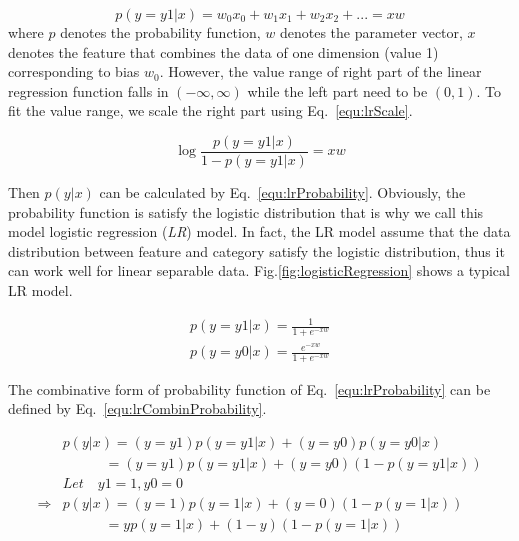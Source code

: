 \documentclass[runningheads,openany]{xhlPaper}
\begin{document}
\begin{equation}
\label{equ:lrLinear}
p\left(y = y1|x\right) = {w_0x_0} + {w_1}{x_1} + {w_2}{x_2} + ... = xw
\end{equation}
where $p$ denotes the probability function, $w$ denotes the parameter vector, $x$ denotes the feature that combines the data of one dimension (value 1) corresponding to bias $w_0$. However, the value range of right part of the linear regression function falls in $\left(-\infty, \infty\right)$ while the left part need to be $\left(0, 1\right)$. To fit the value range, we scale the right part using Eq.~\ref{equ:lrScale}.

\begin{equation}
\label{equ:lrScale}
\log \frac{{p\left( {y = y1|x} \right)}}{{1 - p\left( {y = y1|x} \right)}} = xw
\end{equation}

Then $p\left( {y|x} \right)$ can be calculated by Eq.~\ref{equ:lrProbability}. Obviously, the probability function is satisfy the logistic distribution that is why we call this model logistic regression (\emph{LR}) model. In fact, the LR model assume that the data distribution between feature and category satisfy the logistic distribution, thus it can work well for linear separable data. Fig.\ref{fig:logisticRegression} shows a typical LR model.

\begin{equation}
\label{equ:lrProbability}
\begin{aligned}
p\left( {y=y1|x} \right) = \frac{1}{{1 + {e^{ - xw}}}}\\
p\left( {y=y0|x} \right) = \frac{e^{ - xw}}{{1 + {e^{ - xw}}}}
\end{aligned}
\end{equation}

The combinative form of probability function of Eq.~\ref{equ:lrProbability} can be defined by Eq.~\ref{equ:lrCombinProbability}.

\begin{equation}
\label{equ:lrCombinProbability}
\begin{aligned}
&p\left( {y|x} \right) = \left( {y = y1} \right)p\left( {y = y1|x} \right) + \left( {y = y0} \right)p\left( {y = y0|x} \right)\\
 &\quad\quad\quad= \left( {y = y1} \right)p\left( {y = y1|x} \right) + \left( {y = y0} \right)\left( {1 - p\left( {y = y1|x} \right)} \right)\\
&Let\quad y1 = 1,y0 = 0\\
 \Rightarrow &p\left( {y|x} \right) = \left( {y = 1} \right)p\left( {y = 1|x} \right) + \left( {y = 0} \right)\left( {1 - p\left( {y = 1|x} \right)} \right)\\
 &\quad\quad\quad= yp\left( {y = 1|x} \right) + \left( {1 - y} \right)\left( {1 - p\left( {y = 1|x} \right)} \right)
\end{aligned}
\end{equation}
\end{document}
